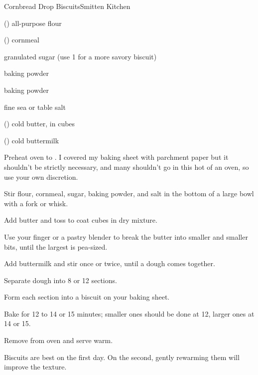 \begin{recipe}{Cornbread Drop Biscuits}{Smitten Kitchen}{}

\begin{ingredients}
\item \C{1\threequarter} () all-purpose flour
\item \C{\twothird} () cornmeal
\item {} granulated sugar (use 1 for a more savory biscuit)
\item {} baking powder
\item \tp{\half} baking powder
\item \tp{\half} fine sea or table salt
\item \C{\half} () cold butter, in cubes
\item {} () cold buttermilk
\end{ingredients}

\begin{directions}
\item Preheat oven to . I covered my baking sheet with parchment paper but it shouldn't be strictly necessary, and many shouldn't go in this hot of an oven, so use your own discretion.
\item Stir flour, cornmeal, sugar, baking powder, and salt in the bottom of a large bowl with a fork or whisk.
\item Add butter and toss to coat cubes in dry mixture.
\item Use your finger or a pastry blender to break the butter into smaller and smaller bits, until the largest is pea-sized.
\item Add buttermilk and stir once or twice, until a dough comes together.
\item Separate dough into 8 or 12 sections.
\item Form each section into a biscuit on your baking sheet.
\item Bake for 12 to 14 or 15 minutes; smaller ones should be done at 12, larger ones at 14 or 15.
\item Remove from oven and serve warm.
\item Biscuits are best on the first day. On the second, gently rewarming them will improve the texture.
\end{directions}
\end{recipe}
